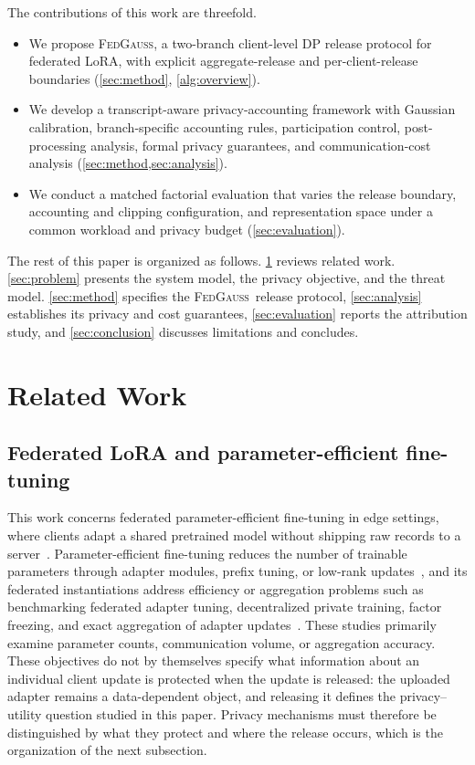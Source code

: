 \documentclass[a4paper,fleqn]{cas-dc}
\newcommand{\method}{\textsc{FedGauss}}
\begin{document}
\par
The contributions of this work are threefold.
\begin{itemize}
\item We propose \method, a two-branch client-level DP release protocol for federated LoRA, with explicit aggregate-release and per-client-release boundaries (\cref{sec:method}, \cref{alg:overview}).
\item We develop a transcript-aware privacy-accounting framework with Gaussian calibration, branch-specific accounting rules,
participation control, post-processing analysis, formal privacy guarantees, and communication-cost analysis (\cref{sec:method,sec:analysis}).
\item We conduct a matched factorial evaluation that varies the release boundary, accounting and clipping configuration, and representation space under a common workload and privacy budget (\cref{sec:evaluation}).
\end{itemize}
\par
The rest of this paper is organized as follows. \cref{sec:related} reviews related work.
\cref{sec:problem} presents the system model, the privacy objective, and the threat model. \cref{sec:method} specifies the \method\ release protocol, \cref{sec:analysis} establishes its privacy and cost guarantees, \cref{sec:evaluation} reports the attribution study, and \cref{sec:conclusion} discusses limitations and concludes.
\par
\section{Related Work}
\label{sec:related}
\par
\subsection{Federated LoRA and parameter-efficient fine-tuning}
\par
This work concerns federated parameter-efficient fine-tuning in edge settings, where clients adapt a shared pretrained model without shipping raw records to a server~\cite{mcmahan2017communication,kairouz2021advances}. Parameter-efficient fine-tuning reduces the number of trainable parameters through adapter modules, prefix tuning, or low-rank updates~\cite{houlsby2019adapter,li2021prefix,lester2021power,hu2022lora}, and its federated instantiations address efficiency or aggregation problems such as benchmarking federated adapter tuning, decentralized private training, factor freezing, and exact aggregation of adapter updates~\cite{zhang2023fedpetuning,ye2024openfedllm,sun2024ffalora,singhal2025fedexlora}. These studies primarily examine parameter counts, communication volume, or aggregation accuracy. These objectives do not by themselves specify what information about an individual client update is protected when the update is released: the uploaded adapter remains a data-dependent object, and releasing it defines the privacy--utility question studied in this paper. Privacy mechanisms must therefore be distinguished by what they protect and where the release occurs, which is the organization of the next subsection.
\par
\end{document}

